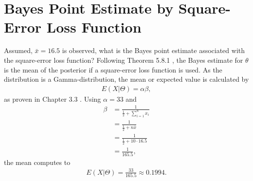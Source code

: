 \section{Bayes Point Estimate by Square-Error Loss Function}
Assumed, $\bar{x} = 16.5$ is observed, what is the Bayes point estimate associated with the square-error loss function?
Following Theorem 5.8.1 \cite{larsen2005introduction}, the Bayes estimate for $\theta$ is the mean of the posterior if a square-error loss function is used. As the distribution is a Gamma-distribution, the mean or expected value is calculated by 
\begin{equation}
\begin{split}
E(X|\Theta) = \alpha\beta,
\end{split}
\label{eq:expvalgamma}
\end{equation}
as proven in Chapter 3.3 \cite{hogg}. Using $\alpha = 33$ and 
\begin{equation}
\begin{split}
\beta &= \frac{1}{\frac{1}{2}+\sum_{i=1}^nx_i}\\
&=\frac{1}{\frac{1}{2}+n\bar{x}}\\
&=\frac{1}{\frac{1}{2}+10\cdot16.5}\\
&=\frac{1}{165.5},
\end{split}
\label{eq:postbeta}
\end{equation}
the mean computes to 
\begin{equation}
\begin{split}
E(X|\Theta) = \frac{33}{165.5} \approx 0.1994.
\end{split}
\label{eq:expvalgammacalc}
\end{equation}


